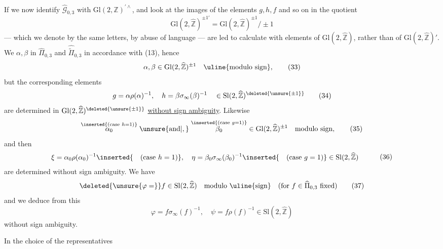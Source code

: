 
If we now identify $\widehat{\mathcal G}_{0,3}$ with $\mathrm{Gl}(2,\mathbb Z)^{\prime\wedge}$, and look at the  images of the elements $g,h,f$ and so on in the quotient
\[
 \mathrm{Gl}(2,\widehat{\mathbb Z})^{\pm1\prime}
 =\mathrm{Gl}(2,\widehat{\mathbb Z})^{\pm1}/\pm1
\]
--- which we denote by the same letters, by abuse of language ---  are led to calculate with elements of $\mathrm{Gl}(2,\widehat{\mathbb Z})$, rather than of $\mathrm{Gl}(2,\widehat{\mathbb Z})'$. We  $\alpha,\beta$ in $\widehat{\Pi}_{0,3}$ and $\widehat{\widetilde{\Pi}}_{0,3}$ in accordance with (13), hence
\[
 \alpha,\beta\in\mathrm{Gl}(2,\widehat{\mathbb Z})^{\pm1}
 \quad\text{\uline{modulo sign}},
 \tag{33}
\]
but the corresponding elements
\[
 g=\alpha\rho(\alpha)^{-1},\quad
 h=\beta\sigma_\infty(\beta)^{-1}
 \quad\in\mathrm{Sl}(2,\widehat{\mathbb Z})^{\deleted{\unsure{\pm1}}}
 \tag{34}
\]
are determined in $\mathrm{Gl}(2,\widehat{\mathbb Z})^{\deleted{\unsure{\pm1}}}$ \uline{without sign ambiguity}. Likewise
\[
 \overset{\inserted{\text{(case }h=1\text{)}}}{\alpha_0}
 \;\unsure{\text{and}|,}\;
 \overset{\inserted{\text{(case }g=1\text{)}}}{\beta_0}
 \in\mathrm{Gl}(2,\widehat{\mathbb Z})^{\pm1}
 \quad\text{modulo sign},
 \tag{35}
\]
and then
\[
 \begin{aligned}
 \xi&=\alpha_0\rho(\alpha_0)^{-1}
 \inserted{\quad\text{(case }h=1\text{)}},\quad
 \eta=\beta_0\sigma_\infty(\beta_0)^{-1}
 \inserted{\quad\text{(case }g=1\text{)}}
 \in\mathrm{Sl}(2,\widehat{\mathbb Z})
 \end{aligned}
 \tag{36}
\]
are determined without sign ambiguity. We have
\[
 \deleted{\unsure{\varphi=} }f\in\mathrm{Sl}(2,\widehat{\mathbb Z})
 \quad\text{modulo \uline{sign}}
 \quad\text{(for }f\in\widehat{\Pi}_{0,3}\text{ fixed)}
 \tag{37}
\]
and we deduce from this
\[
 \varphi=f\sigma_\infty(f)^{-1},\quad
 \psi=f\rho(f)^{-1}\in\mathrm{Sl}(2,\widehat{\mathbb Z})
 \tag{38}
\]
without sign ambiguity.

 In the choice of the  representatives



